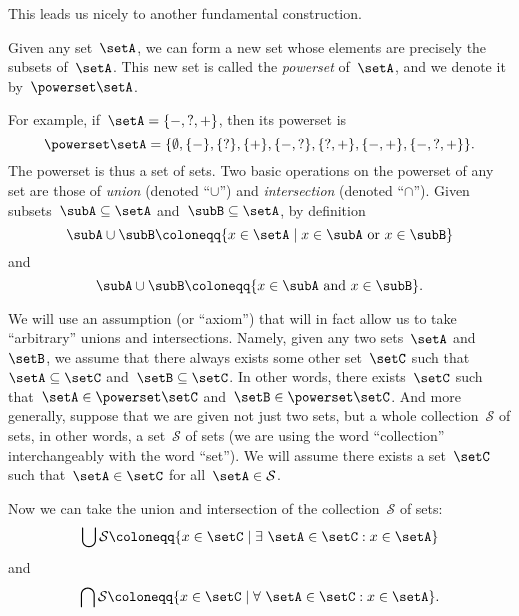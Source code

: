 This leads us nicely to another fundamental construction.

\begin{definition}
    \label{def:power-set}
    Given any set~$\setA$, we can form a new set whose elements are precisely the subsets of~$\setA$.
    This new set is called the \emph{powerset} of~$\setA$, and we denote it by~$\powerset \setA$.
\end{definition}

For example, if~$\setA = \{ -, ?, + \}$, then its powerset is
\begin{equation*}
    \powerset \setA = \{ \emptyset, \{ - \}, \{ ? \}, \{ + \}, \{ -, ? \}, \{ ?, + \}, \{ -, +\}, \{ -, ?, + \} \}.
\end{equation*}
The powerset is thus a set of sets.
Two basic operations on the powerset of any set are those of \emph{union} (denoted ``$\cup$'') and \emph{intersection} (denoted ``$\cap$'').
Given subsets~$\subA \subseteq \setA$ and~$\subB \subseteq \setA$, by definition
\begin{equation*}
    \subA \cup \subB \coloneqq \{ x \in \setA \mid x \in \subA \text{ or } x \in \subB \}
\end{equation*}
and
\begin{equation*}
    \subA \cup \subB \coloneqq \{ x \in \subA \text{ and } x \in \subB \}.
\end{equation*}


We will use an assumption (or ``axiom'') that will in fact allow us to take ``arbitrary'' unions and intersections.
Namely, given any two sets~$\setA$ and~$\setB$, we assume that there always exists some other set~$\setC$ such that~$\setA \subseteq \setC$ and~$\setB \subseteq \setC$.
In other words, there exists~$\setC$ such that~$\setA \in \powerset \setC$ and~$\setB \in \powerset \setC$.
And more generally, suppose that we are given not just two sets, but a whole collection~$\mathcal{S}$ of sets, in other words, a set~$\mathcal{S}$ of sets (we are using the word ``collection'' interchangeably with the word ``set'').
We will assume there exists a set~$\setC$ such that~$\setA \in \setC$ for all~$\setA \in \mathcal{S}$.

Now we can take the union and intersection of the collection~$\mathcal{S}$ of sets:
\begin{equation*}
    \bigcup \mathcal{S} \coloneqq \{ x \in \setC \mid \exists \  \setA \in \setC : x \in \setA \}
\end{equation*}
and
\begin{equation*}
    \bigcap \mathcal{S} \coloneqq \{ x \in \setC \mid \forall \  \setA \in \setC : x \in \setA \}.
\end{equation*}

